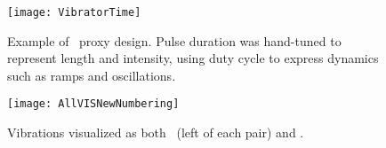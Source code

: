 

%
    
    \begin{figure}
        \centering
        \texttt{[image: VibratorTime]}
        \caption{Example of \lofi\ proxy design. Pulse duration was hand-tuned to represent length and intensity, using duty cycle to express dynamics such as ramps and oscillations.}
        \label{fig:vib:lofidesign}
    \end{figure}

 
    \begin{figure*}
        \centering
                \texttt{[image: AllVISNewNumbering]}
                \caption{Vibrations visualized as both \original\ (left of each pair) and \linear.}
            \label{fig:vis:ref:comparison}
        \end{figure*}



    


